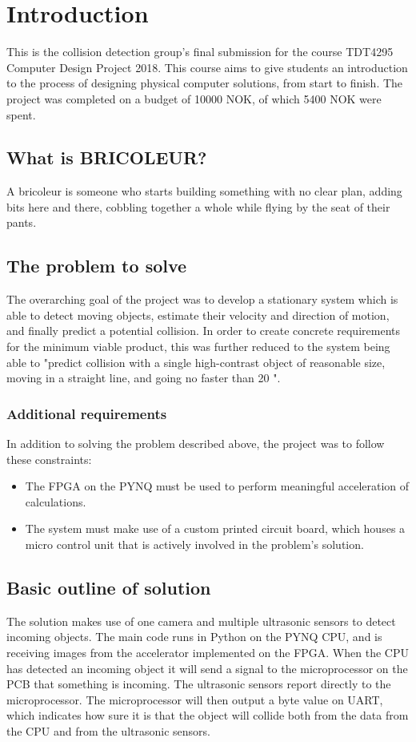 

\section{Introduction}
This is the collision detection group's final submission for the course TDT4295 Computer Design Project 2018. This course aims to give students an introduction to the process of designing physical computer solutions, from start to finish. The project was completed on a budget of 10000 NOK, of which 5400 NOK were spent. 

\subsection{What is BRICOLEUR?}
A bricoleur is someone who starts building something with no clear plan, adding bits here and there, cobbling together a whole while flying by the seat of their pants. 

\subsection{The problem to solve}
The overarching goal of the project was to develop a stationary system which is able to detect moving objects, estimate their velocity and direction of motion, and finally predict a potential collision. In order to create concrete requirements for the minimum viable product, this was further reduced to the system being able to "predict collision with a single high-contrast object of reasonable size, moving in a straight line, and going no faster than 20 ".

\subsubsection{Additional requirements}
In addition to solving the problem described above, the project was to follow these constraints: 
\begin{itemize}
    \item The FPGA on the PYNQ must be used to perform meaningful acceleration of calculations. 
    \item The system must make use of a custom printed circuit board, which houses a micro control unit that is actively involved in the problem's solution. 
\end{itemize}

\subsection{Basic outline of solution}
The solution makes use of one camera and multiple ultrasonic sensors to detect incoming objects. The main code runs in Python on the PYNQ CPU, and is receiving images from the accelerator implemented on the FPGA. When the CPU has detected an incoming object it will send a signal to the microprocessor on the PCB that something is incoming. The ultrasonic sensors report directly to the microprocessor. The microprocessor will then output a byte value on UART, which indicates how sure it is that the object will collide both from the data from the CPU and from the ultrasonic sensors. 
